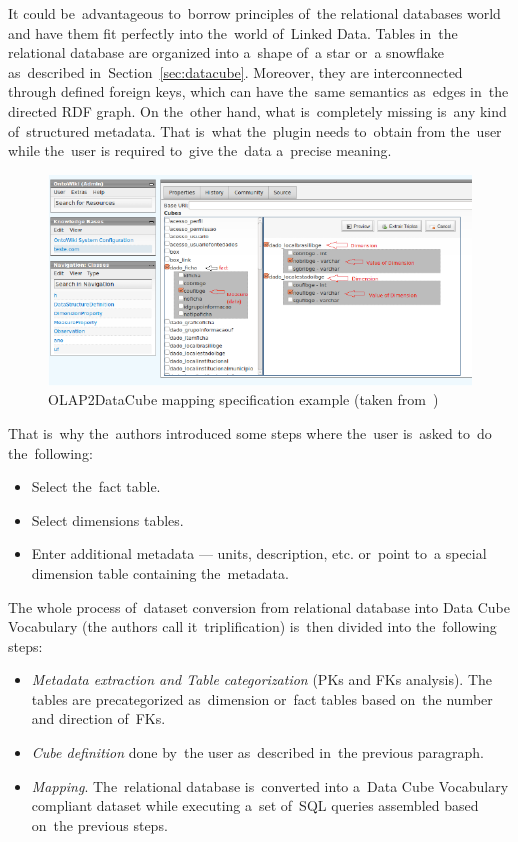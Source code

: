 It could be~advantageous to~borrow principles of~the relational databases world and have them
fit perfectly into the~world of~Linked Data. Tables in~the relational database 
are organized into a~shape of~a star or~a snowflake as~described in~Section~\ref{sec:datacube}.
Moreover, they are interconnected through defined foreign keys,
which can have the~same semantics as~edges in~the directed RDF graph.
On the~other hand, what is~completely missing is~any kind of~structured
metadata. That is~what the~plugin needs to~obtain from the~user while the~user
is required to~give the~data a~precise meaning.

\begin{figure}
	\centering
	\includegraphics[width=140mm]{img/olapimport.png}
	\caption{OLAP2DataCube mapping specification example (taken from~\cite{olap2dc-paper})}
	\label{fig:olap2dc-screen}
\end{figure}


That is~why the~authors introduced some steps where the~user is~asked to~do the~following:
\begin{itemize}
  \item Select the~fact table.
  \item Select dimensions tables.
  \item Enter additional metadata --- units, description, etc. or~point to~a 
  special dimension table containing the~metadata.
\end{itemize}

The whole process of~dataset conversion from relational database into Data Cube Vocabulary
(the authors call it~triplification) is~then divided into the~following steps:
\begin{itemize}
  \item \emph{Metadata extraction and Table categorization} (PKs and FKs analysis). The~  tables are precategorized as~dimension or~fact tables based on~the number and 
  direction of~FKs.
  \item \emph{Cube definition} done by~the user as~described in~the previous paragraph.
  \item \emph{Mapping}. The~relational database is~converted into a~Data Cube 
  Vocabulary compliant dataset while executing a~set of~SQL queries assembled 
  based on~the previous steps.
\end{itemize}

